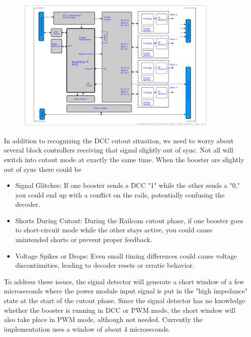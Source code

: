 \begin{figure}[htbp]
    \centering
    \includegraphics[page=6, width=0.9\textwidth]{./Schematics/Schematic_LcsNodes-Quad-Block-Controller.pdf}
\end{figure}
\FloatBarrier

In addition to recognizing the DCC cutout situation, we need to worry about several block controllers receiving that signal slightly out of sync. Not all will switch into cutout mode at exactly the same time. When the booster are slightly out of sync there could be

\begin{itemize}
	\item Signal Glitches: If one booster sends a DCC "1" while the other sends a "0," you could end up with a conflict on the rails, potentially confusing the decoder.
	\item Shorts During Cutout: During the Railcom cutout phase, if one booster goes to short-circuit mode while the other stays active, you could cause unintended shorts or prevent proper feedback.
	\item Voltage Spikes or Drops: Even small timing differences could cause voltage discontinuities, leading to decoder resets or erratic behavior.
\end{itemize}

To address these issues, the signal detector will generate a short window of a few microseconds where the power module input signal is put in the "high impedance" state at the start of the cutout phase. Since the signal detector has no knowledge whether the booster is running in DCC or PWM mode, the short window will also take place in PWM mode, although not needed. Currently the implementation uses a window of about 4 microseconds.

